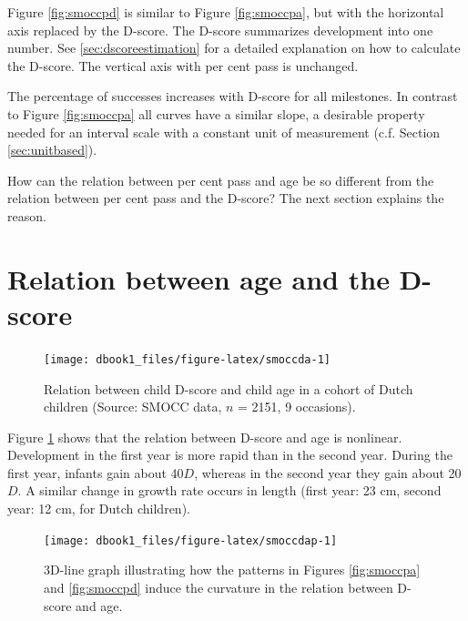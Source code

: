 \documentclass[
]{book}
\begin{document}
Figure \ref{fig:smoccpd} is similar to Figure \ref{fig:smoccpa}, but with the horizontal axis replaced by the D-score. The D-score summarizes development into one number. See \ref{sec:dscoreestimation} for a detailed explanation on how to calculate the D-score. The vertical axis with per cent pass is unchanged.

The percentage of successes increases with D-score for all milestones. In contrast to Figure \ref{fig:smoccpa} all curves have a similar slope, a desirable property needed for an interval scale with a constant unit of measurement (c.f. Section \ref{sec:unitbased}).

How can the relation between per cent pass and age be so different from the relation between per cent pass and the D-score? The next section explains the reason.

\hypertarget{sec:aged}{%
\section{Relation between age and the D-score}\label{sec:aged}}

\begin{figure}

{\centering \texttt{[image: dbook1\_files/figure-latex/smoccda-1]} 

}

\caption{Relation between child D-score and child age in a cohort of Dutch children (Source: SMOCC data, \(n\) = 2151, 9 occasions).}\label{fig:smoccda}
\end{figure}



Figure \ref{fig:smoccda} shows that the relation between D-score and age is nonlinear. Development in the first year is more rapid than in the second year. During the first year, infants gain about 40\(D\), whereas in the second year they gain about 20\(D\). A similar change in growth rate occurs in length (first year: 23 cm, second year: 12 cm, for Dutch children).

\begin{figure}

{\centering \texttt{[image: dbook1\_files/figure-latex/smoccdap-1]} 

}

\caption{3D-line graph illustrating how the patterns in Figures \ref{fig:smoccpa} and \ref{fig:smoccpd} induce the curvature in the relation between D-score and age.}\label{fig:smoccdap}
\end{figure}
\end{document}
